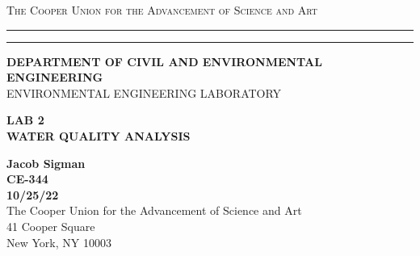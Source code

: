 \begin{titlepage}
    \begin{center}
    {{\Large{\textsc{The Cooper Union for the Advancement of Science and Art}}}} \rule[0.1cm]{15.8cm}{0.1mm}
    \rule[0.5cm]{15.8cm}{0.6mm}
    {\small{\bf DEPARTMENT OF CIVIL AND ENVIRONMENTAL ENGINEERING}}\\
    {\footnotesize{ENVIRONMENTAL ENGINEERING LABORATORY}}
    \end{center}
    \vspace{15mm}
    \begin{center}
    {\large{\bf LAB 2\\}}
    \vspace{5mm}
    {\Large{\bf WATER QUALITY ANALYSIS}}
    \end{center}
    \vspace{35mm}
    \par
    \noindent
    \hfill
    \vspace{60mm}
    \begin{center}
    {\large{\bf Jacob Sigman \\ CE-344 \\ 10/25/22 \\}}
    \vspace{20mm}
    {\normalsize{The Cooper Union for the Advancement of Science and Art \\ 41 Cooper Square\\
    New York, NY 10003}}
    \end{center}
\end{titlepage}